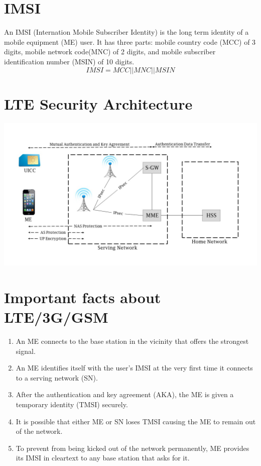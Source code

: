 \documentclass[portrait,a0]{a0poster}
\begin{document}
\begin{multicols}{2} %
\section{IMSI}
An IMSI (Internation Mobile Subscriber Identity) is the long term identity of a mobile equipment (ME) user. It has three parts: mobile country code (MCC) of 3 digits, mobile network code(MNC) of 2 digits, and mobile subscriber identification number (MSIN) of 10 digits. 
$$IMSI = MCC||MNC||MSIN$$

\section{LTE Security Architecture}
\begin{center}
\begin{minipage}[t]{0.9\linewidth} %
\vspace{-1.8cm} %
\includegraphics[width=1\linewidth]{architecture}
\hspace{0pt}
\end{minipage} 
\end{center}

\section{Important facts about LTE/3G/GSM}
\begin{enumerate}
\item An ME connects to the base station in the vicinity that offers the strongest signal.
\item An ME identifies itself with the user's IMSI at the very first time it connects to a serving network (SN).
\item After the authentication and key agreement (AKA), the ME is given a temporary identity (TMSI) securely.
\item It is possible that either ME or SN loses TMSI causing the ME to remain out of the network.
\item To prevent from being kicked out of the network permanently, ME provides its IMSI in cleartext to any base station that asks for it.
\end{enumerate}



\end{multicols}
\end{document}
